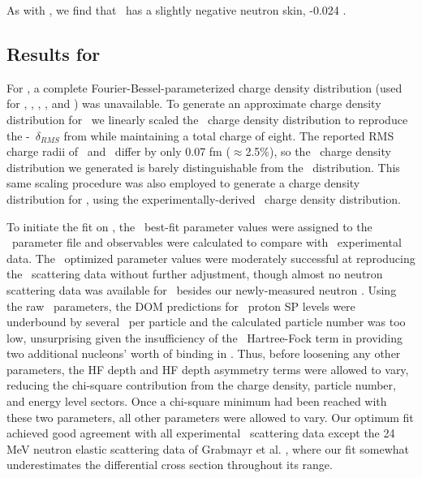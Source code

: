 As with \caForty, we find that \oSix\ has a slightly negative neutron skin,
-0.024 \femto\meter.

\subsection{Results for \oEight}
For \oEight, a complete Fourier-Bessel-parameterized charge density distribution (used
for \oSix, \caAughtEight, \niEightFour, \snTwelve, and \pbEight) was unavailable. To
generate an approximate charge density distribution for \oEight\, we linearly
scaled the \oSix\ charge density distribution to reproduce
the \oEight-\oSix\ $\delta_{RMS}$
from \cite{DeVries1987} while maintaining a total charge of eight.
The reported RMS charge radii of \oSix\ and \oEight\ differ by only
0.07 fm ($\approx$2.5\%), so the \oEight\ charge density distribution
we generated is barely distinguishable from the \oSix\ distribution.
This same scaling procedure was also employed to
generate a charge density distribution for \snTwelve, using the
experimentally-derived \snFour\ charge density distribution.

To initiate the fit on \oEight, the \oSix\ best-fit parameter values
were assigned to the \oEight\ parameter file and observables were calculated to compare
with \oEight\ experimental data. The \oSix\ optimized parameter values
were moderately successful at reproducing
the \oEight\ scattering data without further adjustment, though almost no
neutron scattering data was
available for \oEight\ besides our newly-measured neutron \tot.
Using the raw \oSix\ parameters, the DOM predictions for
\oEight\ proton SP levels were underbound by several \mega\electronvolt\ per
particle and the calculated particle number was too low, unsurprising
given the insufficiency of the \oSix\ Hartree-Fock term in providing
two additional nucleons' worth of binding in \oEight. Thus, before
loosening any other parameters, the HF depth and HF depth asymmetry terms were allowed to vary,
reducing the chi-square contribution from the charge density, particle number, and energy level
sectors. Once a chi-square minimum had been reached with these two parameters, all other 
parameters were allowed to vary. Our optimum fit achieved good agreement with all
experimental \oEight\ scattering data except the 24 MeV neutron elastic scattering data
of Grabmayr et al. \cite{Grabmayr1980}, where our fit somewhat underestimates
the differential cross section throughout its range.

